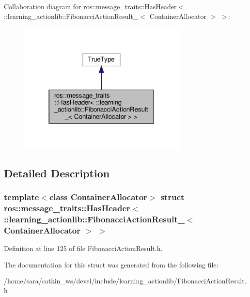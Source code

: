 Collaboration diagram for ros\+:\+:message\+\_\+traits\+:\+:Has\+Header$<$ \+:\+:learning\+\_\+actionlib\+:\+:Fibonacci\+Action\+Result\+\_\+$<$ Container\+Allocator $>$ $>$\+:
\nopagebreak
\begin{figure}[H]
\begin{center}
\leavevmode
\includegraphics[width=242pt]{structros_1_1message__traits_1_1HasHeader_3_01_1_1learning__actionlib_1_1FibonacciActionResult__bb3518c6651be22c298069bfe78abe7f}
\end{center}
\end{figure}


\subsection{Detailed Description}
\subsubsection*{template$<$class Container\+Allocator$>$\newline
struct ros\+::message\+\_\+traits\+::\+Has\+Header$<$ \+::learning\+\_\+actionlib\+::\+Fibonacci\+Action\+Result\+\_\+$<$ Container\+Allocator $>$ $>$}



Definition at line 125 of file Fibonacci\+Action\+Result.\+h.



The documentation for this struct was generated from the following file\+:\begin{DoxyCompactItemize}
\item 
/home/sara/catkin\+\_\+ws/devel/include/learning\+\_\+actionlib/Fibonacci\+Action\+Result.\+h\end{DoxyCompactItemize}
